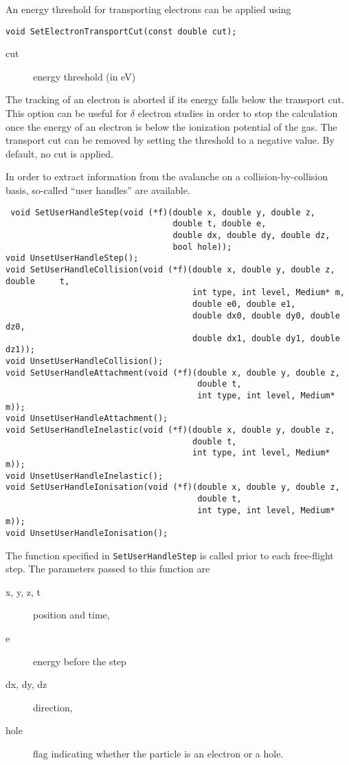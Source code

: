 An energy threshold for transporting electrons can be applied using 
\begin{lstlisting}
void SetElectronTransportCut(const double cut);
\end{lstlisting}
\begin{description}
  \item[cut] energy threshold (in eV)
\end{description}
The tracking of an electron is aborted if its energy falls below the 
transport cut. This option can be useful for \(\delta\) electron studies in 
order to stop the calculation once the energy of an electron 
is below the ionization potential of the gas. 
The transport cut can be removed by setting the threshold to a negative value.
By default, no cut is applied.

In order to extract information from the avalanche on a collision-by-collision basis, 
so-called ``user handles'' are available. 
\begin{lstlisting}
 void SetUserHandleStep(void (*f)(double x, double y, double z,
                                  double t, double e,
                                  double dx, double dy, double dz,
                                  bool hole));
void UnsetUserHandleStep();
void SetUserHandleCollision(void (*f)(double x, double y, double z, double     t,
                                      int type, int level, Medium* m,
                                      double e0, double e1,
                                      double dx0, double dy0, double dz0,
                                      double dx1, double dy1, double dz1));
void UnsetUserHandleCollision();
void SetUserHandleAttachment(void (*f)(double x, double y, double z,
                                       double t,
                                       int type, int level, Medium* m));
void UnsetUserHandleAttachment();
void SetUserHandleInelastic(void (*f)(double x, double y, double z,
                                      double t,
                                      int type, int level, Medium* m));
void UnsetUserHandleInelastic();
void SetUserHandleIonisation(void (*f)(double x, double y, double z,
                                       double t,
                                       int type, int level, Medium* m));
void UnsetUserHandleIonisation();
\end{lstlisting}
The function specified in \texttt{SetUserHandleStep} is called 
prior to each free-flight step. 
The parameters passed to this function are 
\begin{description}
  \item[x, y, z, t] 
  position and time, 
  \item[e]
  energy before the step
  \item[dx, dy, dz] 
  direction,
  \item[hole]
  flag indicating whether the particle is an electron or a hole.
\end{description}  
